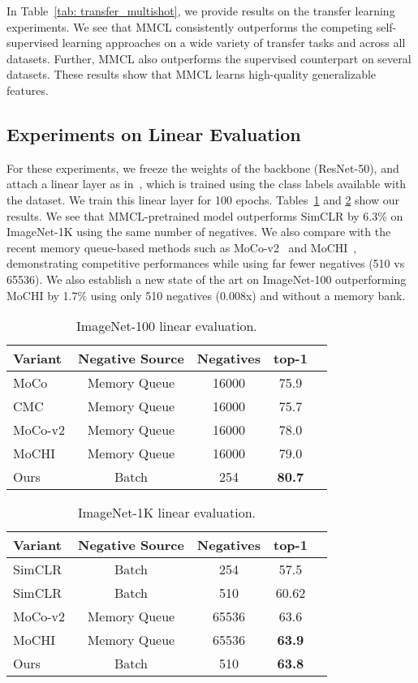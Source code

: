 \documentclass[letterpaper]{article} \usepackage{aaai22}  \usepackage{times}  \usepackage{helvet}  \usepackage{courier}  \usepackage[hyphens]{url}  \usepackage{graphicx} \urlstyle{rm} \def\UrlFont{\rm}  \usepackage{natbib}  \usepackage{caption} \DeclareCaptionStyle{ruled}{labelfont=normalfont,labelsep=colon,strut=off} \frenchspacing  \setlength{\pdfpagewidth}{8.5in}  \setlength{\pdfpageheight}{11in}
\begin{document}
In Table~\ref{tab: transfer_multishot}, we provide results on the transfer learning experiments. We see that MMCL consistently outperforms the competing self-supervised learning approaches on a wide variety of transfer tasks and across all datasets. Further, MMCL also outperforms the supervised counterpart on several datasets. These results show that MMCL learns high-quality generalizable features.
\subsection{Experiments on Linear Evaluation}
For these experiments, we freeze the weights of the backbone (ResNet-50), and attach a linear layer as in~\cite{chen2020simple}, which is trained using the class labels available with the dataset. We train this linear layer for 100 epochs. Tables~\ref{tab: imagenet_100} and \ref{tab: imagenet_1k} show our results. We see that MMCL-pretrained model outperforms SimCLR by 6.3\% on ImageNet-1K using the same number of negatives. We also compare with the recent memory queue-based methods such as MoCo-v2~\cite{chen2020improved} and MoCHI~\cite{kalantidis2020hard}, demonstrating competitive performances while using far fewer negatives (510 vs 65536). We also establish a new state of the art on ImageNet-100 outperforming MoCHI by 1.7\% using only 510 negatives (0.008x) and without a memory bank.
\begin{table}[!htb]
    \centering
    \begin{tabular}{lcccr}
        \toprule
        Variant & Negative Source & Negatives & top-1 \\
        \toprule
        MoCo & Memory Queue & 16000 & 75.9 \\
        CMC & Memory Queue &16000 & 75.7 \\
        MoCo-v2  & Memory Queue & 16000 & 78.0 \\
        MoCHI & Memory Queue & 16000 & 79.0 \\
        \midrule
        Ours & Batch & 254 & \textbf{80.7} \\
        \bottomrule
        \end{tabular}
        \caption{ImageNet-100 linear evaluation.
        \label{tab: imagenet_100}
        }
\end{table}

\begin{table}[!htb]
    \centering
    \begin{tabular}{lcccr}
        \toprule
        Variant & Negative Source & Negatives & top-1 \\
        \toprule
        SimCLR  & Batch & 254 & 57.5 \\
        SimCLR  & Batch & 510 & 60.62 \\
        \midrule
        MoCo-v2 & Memory Queue & 65536 & 63.6 \\
        MoCHI & Memory Queue & 65536 & \textbf{63.9} \\
        \midrule
        Ours & Batch & 510 & \textbf{63.8} \\
        \bottomrule
        \end{tabular}
        \caption{ImageNet-1K linear evaluation. 
        \label{tab: imagenet_1k}}
\end{table}
\end{document}
